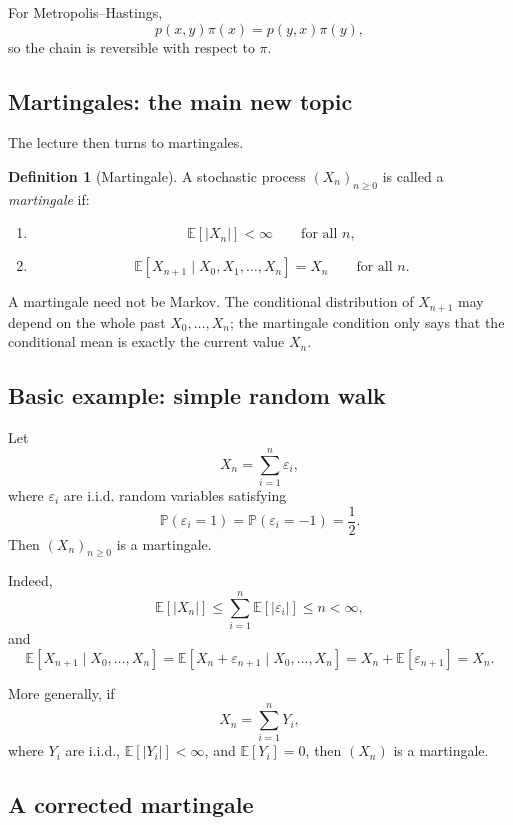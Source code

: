 \documentclass[11pt]{article}
\theoremstyle{definition}
\newtheorem{definition}[theorem]{Definition}
\begin{document}
\begin{keyformula}
For Metropolis--Hastings,
\[
p(x,y)\pi(x)=p(y,x)\pi(y),
\]
so the chain is reversible with respect to \(\pi\).
\end{keyformula}

\subsection{Martingales: the main new topic}

The lecture then turns to martingales.

\begin{definition}[Martingale]
A stochastic process \((X_n)_{n\ge 0}\) is called a \emph{martingale} if:
\begin{enumerate}[label=(\roman*)]
    \item
    \[
    \mathbb E[|X_n|]<\infty
    \qquad \text{for all } n,
    \]
    \item
    \[
    \mathbb E[X_{n+1}\mid X_0,X_1,\dots,X_n]=X_n
    \qquad \text{for all } n.
    \]
\end{enumerate}
\end{definition}

A martingale need not be Markov. The conditional distribution of \(X_{n+1}\) may depend on the whole past \(X_0,\dots,X_n\); the martingale condition only says that the conditional mean is exactly the current value \(X_n\).

\subsection{Basic example: simple random walk}

Let
\[
X_n=\sum_{i=1}^n \varepsilon_i,
\]
where \(\varepsilon_i\) are i.i.d. random variables satisfying
\[
\mathbb P(\varepsilon_i=1)=\mathbb P(\varepsilon_i=-1)=\frac12.
\]
Then \((X_n)_{n\ge 0}\) is a martingale.

Indeed,
\[
\mathbb E[|X_n|]\le \sum_{i=1}^n \mathbb E[|\varepsilon_i|]\le n<\infty,
\]
and
\[
\mathbb E[X_{n+1}\mid X_0,\dots,X_n]
=
\mathbb E[X_n+\varepsilon_{n+1}\mid X_0,\dots,X_n]
=
X_n+\mathbb E[\varepsilon_{n+1}]
=
X_n.
\]

More generally, if
\[
X_n=\sum_{i=1}^n Y_i,
\]
where \(Y_i\) are i.i.d., \(\mathbb E[|Y_i|]<\infty\), and \(\mathbb E[Y_i]=0\), then \((X_n)\) is a martingale.

\subsection{A corrected martingale}
\end{document}
